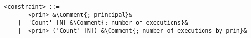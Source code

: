 \lstset{mathescape, language=AST, escapechar=\&}  
\begin{minipage}[c]{0.95\textwidth}
\begin{lstlisting}[frame=single, caption={constraint},label={lst:constraintast}]
<constraint> ::=  
       <prin> &\Comment{; principal}&
    |  'Count' [N] &\Comment{; number of executions}&
    |  <prin> ('Count' [N]) &\Comment{; number of executions by prin}&
\end{lstlisting}
\end{minipage}
